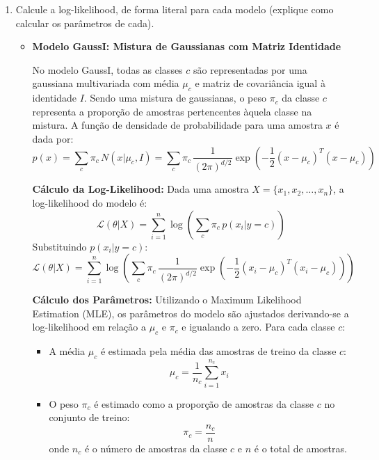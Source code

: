 \begin{enumerate}
    \item Calcule a log-likelihood, de forma literal para cada modelo (explique como calcular os parâmetros de cada).
    \begin{tcolorbox}[title=Resposta:]
        
        \begin{itemize}
            \item \textbf{Modelo GaussI: Mistura de Gaussianas com Matriz Identidade}
        
            No modelo GaussI, todas as classes \( c \) são representadas por uma gaussiana multivariada com média \( \mu_c \) e matriz de covariância igual à identidade \( I \). Sendo uma mistura de gaussianas, o peso \( \pi_c \) da classe \( c \) representa a proporção de amostras pertencentes àquela classe na mistura. A função de densidade de probabilidade para uma amostra \( x \) é dada por:
            \[
            p(x) = \sum_{c} \pi_c \, N(x | \mu_c, I) = \sum_{c} \pi_c \, \frac{1}{(2\pi)^{d/2}} \exp \left( -\frac{1}{2} (x - \mu_c)^T (x - \mu_c) \right)
            \]

            \textbf{Cálculo da Log-Likelihood:}  
            Dada uma amostra \( X = \{x_1, x_2, \dots, x_n\} \), a log-likelihood do modelo é:
            \[
            \mathcal{L}(\theta | X) = \sum_{i=1}^n \log \left( \sum_{c} \pi_c \, p(x_i | y=c) \right)
            \]
            Substituindo \( p(x_i | y=c) \):
            \[
            \mathcal{L}(\theta | X) = \sum_{i=1}^n \log \left( \sum_{c} \pi_c \, \frac{1}{(2\pi)^{d/2}} \exp \left( -\frac{1}{2} (x_i - \mu_c)^T (x_i - \mu_c) \right) \right)
            \]
        
            \textbf{Cálculo dos Parâmetros:}  
            Utilizando o Maximum Likelihood Estimation (MLE), os parâmetros do modelo são ajustados derivando-se a log-likelihood em relação a \( \mu_c \) e \( \pi_c \) e igualando a zero.
            Para cada classe \( c \):
            \begin{itemize}
                \item A média \( \mu_c \) é estimada pela média das amostras de treino da classe \( c \):
                \[
                \mu_c = \frac{1}{n_c} \sum_{i=1}^{n_c} x_i
                \]
                \item O peso \( \pi_c \) é estimado como a proporção de amostras da classe \( c \) no conjunto de treino:
                \[
                \pi_c = \frac{n_c}{n}
                \]
                onde \( n_c \) é o número de amostras da classe \( c \) e \( n \) é o total de amostras.
            \end{itemize}


\end{itemize}
\end{tcolorbox}
\end{enumerate}
